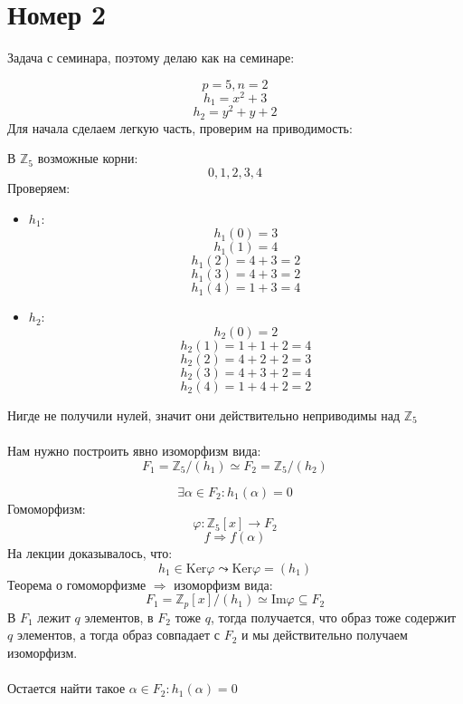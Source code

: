 \documentclass[a4paper,12pt]{article}
\begin{document}
\clearpage

\section*{Номер 2}
Задача с семинара, поэтому делаю как на семинаре:

\[
p = 5,  n = 2
\]
\[
h_1 = x^2 + 3
\]
\[
h_2 = y^2 + y + 2
\]
Для начала сделаем легкую часть, проверим на приводимость:

В $\mathbb{Z}_5$ возможные корни:
\[
0, 1, 2, 3, 4
\]
Проверяем:
\begin{itemize}
\item $h_1$:
 \[
h_1(0) = 3
\]
\[
h_1(1) = 4
\]
\[
h_1(2) = 4 + 3 = 2
\]
\[
h_1(3) = 4 + 3 = 2
\]
\[
h_1(4) = 1 + 3 = 4
\]
\item $h_2$:
\[
h_2(0) = 2
\]
\[
h_2(1) = 1 + 1 + 2 = 4
\]
\[
h_2(2) = 4 + 2 + 2 = 3
\]
\[
h_2(3) = 4 + 3 + 2 = 4
\]
\[
h_2(4) = 1 + 4 + 2 = 2
\]
\end{itemize}
Нигде не получили нулей, значит они действительно неприводимы над $\mathbb{Z}_5$
\\\\
Нам нужно построить явно изоморфизм вида:
\[
F_1 = \mathbb{Z}_5 /(h_1) \simeq F_2 = \mathbb{Z}_5/(h_2) 
\]

\[
\exists \alpha \in F_2 : h_1(\alpha) = 0
\]
\clearpage
Гомоморфизм:
\[
\varphi : \mathbb{Z}_5[x] \rightarrow F_2
\]
\[
f \Rightarrow f(\alpha)
\]
На лекции доказывалось, что:
\[
h_1 \in \text{Ker} \varphi \leadsto \text{Ker} \varphi = (h_1)
\]
Теорема о гомоморфизме $\Rightarrow$ изоморфизм вида:
\[
F_1 = \mathbb{Z}_p[x] / (h_1) \simeq \text{Im} \varphi \subseteq F_2
\] 
В $F_1$ лежит $q$ элементов, в $F_2$ тоже $q$, тогда получается, что образ тоже содержит $q$ элементов, а тогда образ совпадает с $F_2$ и мы действительно получаем изоморфизм.
\\\\
Остается найти такое $\alpha \in F_2  : h_1(\alpha) = 0$
\end{document}
